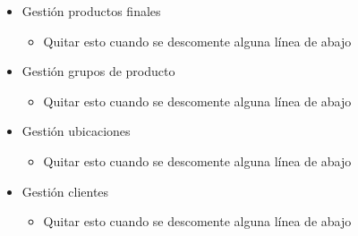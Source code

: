 \begin{itemize}
\begin{itemize}
		\end{itemize}
		\item Gestión productos finales
		\begin{itemize}
			\item Quitar esto cuando se descomente alguna línea de abajo
		\end{itemize}
		\item Gestión grupos de producto
		\begin{itemize}
			\item Quitar esto cuando se descomente alguna línea de abajo
		\end{itemize}
		\item Gestión ubicaciones
		\begin{itemize}
			\item Quitar esto cuando se descomente alguna línea de abajo
		\end{itemize}
		\item Gestión clientes
		\begin{itemize}
			\item Quitar esto cuando se descomente alguna línea de abajo

\end{itemize}
\end{itemize}
